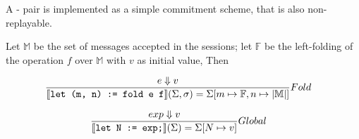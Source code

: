 \documentclass[acmsmall,review,anonymous]{acmart}\settopmatter{printfolios=true}
\begin{document}
A - pair is implemented as a simple commitment scheme, that is also non-replayable.

Let $\mathbb{M}$ be the set of messages accepted in the sessions;
let $\mathbb{F}$ be the left-folding of the operation $f$ over $\mathbb{M}$ with $v$ as initial value,
Then

\begin{align*}
	\judge{&Fold}{
		e \Downarrow v
	}{
		\semfunc[let (m, n) := fold e f](\Sigma, \sigma) = \Sigma [m \mapsto \mathbb{F}, n \mapsto |\mathbb{M}| ]
	}
\end{align*}


\begin{align*}
	\judge{&Global}{
		exp \Downarrow v
	}{
		\semfunc[let N := exp;](\Sigma) = \Sigma [N \mapsto v]
	}
\end{align*}







\newpage

%



\newpage


% 

%
\end{document}
